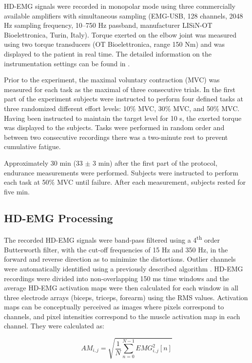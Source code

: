HD-EMG signals were recorded in monopolar mode using three commercially available amplifiers with simultaneous sampling (EMG-USB, 128 channels, 2048 Hz sampling frequency, 10–750 Hz passband, manufacturer LISiN-OT Bioelettronica, Turin, Italy). Torque exerted on the elbow joint was measured using two torque transducers (OT Bioelettronica, range 150 Nm) and was displayed to the patient in real time. The detailed information on the instrumentation settings can be found in \citep{Rojas-Martinez2012}.

Prior to the experiment, the maximal voluntary contraction (MVC) was measured for each task as the maximal of three consecutive trials. In the first part of the experiment subjects were instructed to perform four defined tasks at three randomized different effort levels: 10\% MVC, 30\% MVC, and 50\% MVC. Having been instructed to maintain the target level for 10 s, the exerted torque was displayed to the subjects. Tasks were performed in random order and between two consecutive recordings there was a two-minute rest to prevent cumulative fatigue.

Approximately 30 min (33 $\pm$ 3 min) after the first part of the protocol, endurance measurements were performed. Subjects were instructed to perform each task at 50\% MVC until failure. After each measurement, subjects rested for five min.

\subsection{HD-EMG Processing}
The recorded HD-EMG signals were band-pass filtered using a 4\textsuperscript{th} order Butterworth filter, with the cut-off frequencies of 15 Hz and 350 Hz, in the forward and reverse direction as to minimize the distortions. Outlier channels were automatically identified using a previously described algorithm \citep{Rojas-Martinez2012}.
HD-EMG recordings were divided into non-overlapping 150 ms time windows and the average HD-EMG activation maps were then calculated for each window in all three electrode arrays (biceps, triceps, forearm) using the RMS values. Activation maps can be conceptually perceived as images where pixels correspond to channels, and pixel intensities correspond to the muscle activation map in each channel. They were calculated as:

\begin{equation} \label{eq:3-1}
AM_{i,j} = \sqrt{\frac{1}{N} \sum_{n=0}^{N-1} EMG_{i,j}^{2}[n] }
\end{equation}

